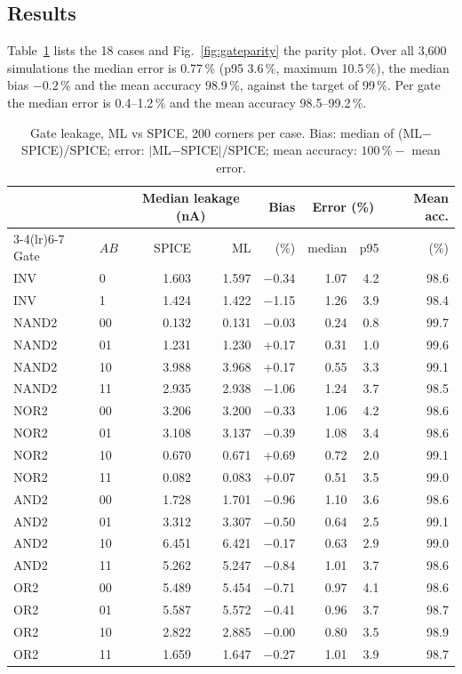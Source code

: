 \documentclass[11pt,a4paper]{article}
\begin{document}
\subsection{Results}
Table~\ref{tab:gates} lists the 18 cases and Fig.~\ref{fig:gateparity} the parity plot. Over all 3{,}600
simulations the median error is 0.77\,\% (p95 3.6\,\%, maximum 10.5\,\%), the median bias $-0.2$\,\% and
the mean accuracy 98.9\,\%, against the target of 99\,\%. Per gate the median error is 0.4--1.2\,\% and
the mean accuracy 98.5--99.2\,\%.

\begin{table}[!htbp]
\centering
\caption{Gate leakage, ML vs SPICE, 200 corners per case. Bias: median of (ML$-$SPICE)/SPICE;
error: $|$ML$-$SPICE$|$/SPICE; mean accuracy: $100\,\% - $ mean error.}
\label{tab:gates}
\small
\begin{tabular}{llrrrrrr}
\toprule
 & & \multicolumn{2}{c}{Median leakage (nA)} & Bias & \multicolumn{2}{c}{Error (\%)} & Mean acc. \\
\cmidrule(lr){3-4}\cmidrule(lr){6-7}
Gate & $AB$ & SPICE & ML & (\%) & median & p95 & (\%) \\
\midrule
INV & 0 & 1.603 & 1.597 & $-$0.34 & 1.07 & 4.2 & 98.6 \\
INV & 1 & 1.424 & 1.422 & $-$1.15 & 1.26 & 3.9 & 98.4 \\
\midrule
NAND2 & 00 & 0.132 & 0.131 & $-$0.03 & 0.24 & 0.8 & 99.7 \\
NAND2 & 01 & 1.231 & 1.230 & +0.17 & 0.31 & 1.0 & 99.6 \\
NAND2 & 10 & 3.988 & 3.968 & +0.17 & 0.55 & 3.3 & 99.1 \\
NAND2 & 11 & 2.935 & 2.938 & $-$1.06 & 1.24 & 3.7 & 98.5 \\
\midrule
NOR2 & 00 & 3.206 & 3.200 & $-$0.33 & 1.06 & 4.2 & 98.6 \\
NOR2 & 01 & 3.108 & 3.137 & $-$0.39 & 1.08 & 3.4 & 98.6 \\
NOR2 & 10 & 0.670 & 0.671 & +0.69 & 0.72 & 2.0 & 99.1 \\
NOR2 & 11 & 0.082 & 0.083 & +0.07 & 0.51 & 3.5 & 99.0 \\
\midrule
AND2 & 00 & 1.728 & 1.701 & $-$0.96 & 1.10 & 3.6 & 98.6 \\
AND2 & 01 & 3.312 & 3.307 & $-$0.50 & 0.64 & 2.5 & 99.1 \\
AND2 & 10 & 6.451 & 6.421 & $-$0.17 & 0.63 & 2.9 & 99.0 \\
AND2 & 11 & 5.262 & 5.247 & $-$0.84 & 1.01 & 3.7 & 98.6 \\
\midrule
OR2 & 00 & 5.489 & 5.454 & $-$0.71 & 0.97 & 4.1 & 98.6 \\
OR2 & 01 & 5.587 & 5.572 & $-$0.41 & 0.96 & 3.7 & 98.7 \\
OR2 & 10 & 2.822 & 2.885 & $-$0.00 & 0.80 & 3.5 & 98.9 \\
OR2 & 11 & 1.659 & 1.647 & $-$0.27 & 1.01 & 3.9 & 98.7 \\
\bottomrule
\end{tabular}
\end{table}
\end{document}
